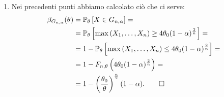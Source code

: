 \begin{soluzione}
\begin{enumerate}
  \item Nei precedenti punti abbiamo calcolato ciò che ci serve:
    \begin{align*}
      \beta_{G_{n, \alpha}} (\theta) &= \mathbb{P}_\theta \left[X \in G_{n, \alpha}\right] = \\
                                     &= \mathbb{P}_\theta \left[ \max \left( X_1, \dots{}, X_n
                                       \right) \ge 4 \theta_0 (1-\alpha)^{\frac{2}{n}} \right] = \\
                                     &= 1 - \mathbb{P}_\theta \left[ \max \left( X_1, \dots{}, X_n
                                       \right) \le 4 \theta_0 (1-\alpha)^{\frac{2}{n}} \right] =
      \\
                                     &= 1 - F_{n, \theta} \left( 4\theta_0(1-\alpha)^{\frac{2}{n}}
                                       \right) = \\
                                     &= 1 -
                                       \left(\frac{\theta_0}{\theta}\right)^{\frac{n}{2}}(1-\alpha) .\qedhere
    \end{align*}
  \end{enumerate}
\end{soluzione}


